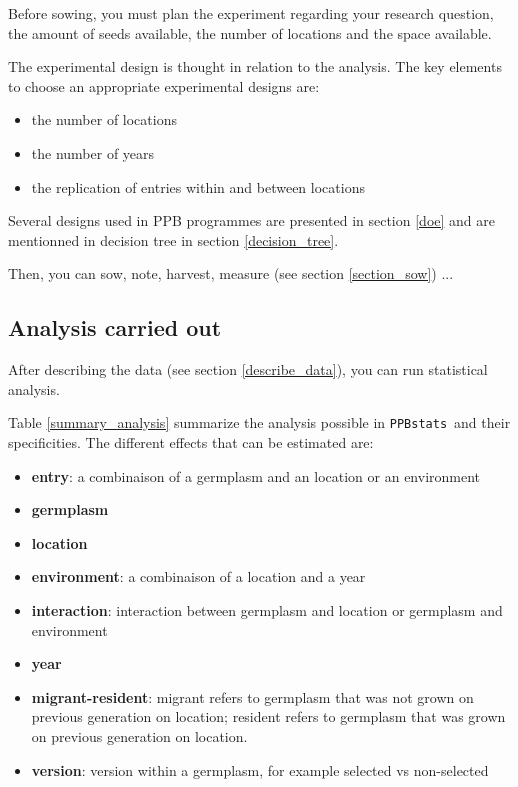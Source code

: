 \documentclass{book}\usepackage[]{graphicx}\usepackage[]{color}
\newcommand{\pack}{\texttt{PPBstats}}
\begin{document}
Before sowing, you must plan the experiment regarding your research question, the amount of seeds available, the number of locations and the space available.

The experimental design is thought in relation to the analysis.
The key elements to choose an appropriate experimental designs are:
\begin{itemize}
\item the number of locations
\item the number of years
\item the replication of entries within and between locations
\end{itemize}

\noindent Several designs used in PPB programmes are presented in section \ref{doe} and are mentionned in decision tree in section \ref{decision_tree}.

Then, you can sow, note, harvest, measure (see section \ref{section_sow}) ...


\subsection{Analysis carried out}

After describing the data (see section \ref{describe_data}), you can run statistical analysis.

Table \ref{summary_analysis} summarize the analysis possible in \pack~and their specificities.
The different effects that can be estimated are:
\begin{itemize}
\item \textbf{entry}: a combinaison of a germplasm and an location or an environment
\item \textbf{germplasm}
\item \textbf{location}
\item \textbf{environment}: a combinaison of a location and a year
\item \textbf{interaction}: interaction between germplasm and location or germplasm and environment
\item \textbf{year}
\item \textbf{migrant-resident}: migrant refers to germplasm that was not grown on previous generation on location; resident refers to germplasm that was grown  on previous generation on location.
\item \textbf{version}: version within a germplasm, for example selected vs non-selected
\end{itemize}
\end{document}
